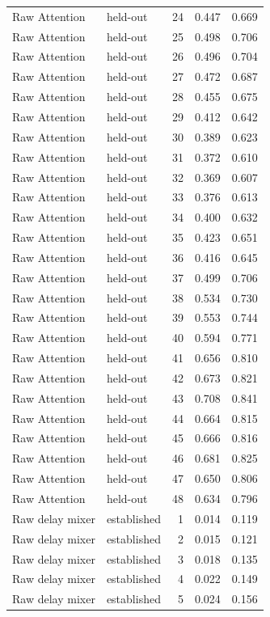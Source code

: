 \begin{tabular}{llrrr}
Raw Attention & held-out & 24 & 0.447 & 0.669 \\
Raw Attention & held-out & 25 & 0.498 & 0.706 \\
Raw Attention & held-out & 26 & 0.496 & 0.704 \\
Raw Attention & held-out & 27 & 0.472 & 0.687 \\
Raw Attention & held-out & 28 & 0.455 & 0.675 \\
Raw Attention & held-out & 29 & 0.412 & 0.642 \\
Raw Attention & held-out & 30 & 0.389 & 0.623 \\
Raw Attention & held-out & 31 & 0.372 & 0.610 \\
Raw Attention & held-out & 32 & 0.369 & 0.607 \\
Raw Attention & held-out & 33 & 0.376 & 0.613 \\
Raw Attention & held-out & 34 & 0.400 & 0.632 \\
Raw Attention & held-out & 35 & 0.423 & 0.651 \\
Raw Attention & held-out & 36 & 0.416 & 0.645 \\
Raw Attention & held-out & 37 & 0.499 & 0.706 \\
Raw Attention & held-out & 38 & 0.534 & 0.730 \\
Raw Attention & held-out & 39 & 0.553 & 0.744 \\
Raw Attention & held-out & 40 & 0.594 & 0.771 \\
Raw Attention & held-out & 41 & 0.656 & 0.810 \\
Raw Attention & held-out & 42 & 0.673 & 0.821 \\
Raw Attention & held-out & 43 & 0.708 & 0.841 \\
Raw Attention & held-out & 44 & 0.664 & 0.815 \\
Raw Attention & held-out & 45 & 0.666 & 0.816 \\
Raw Attention & held-out & 46 & 0.681 & 0.825 \\
Raw Attention & held-out & 47 & 0.650 & 0.806 \\
Raw Attention & held-out & 48 & 0.634 & 0.796 \\
Raw delay mixer & established & 1 & 0.014 & 0.119 \\
Raw delay mixer & established & 2 & 0.015 & 0.121 \\
Raw delay mixer & established & 3 & 0.018 & 0.135 \\
Raw delay mixer & established & 4 & 0.022 & 0.149 \\
Raw delay mixer & established & 5 & 0.024 & 0.156 \\

\end{tabular}
